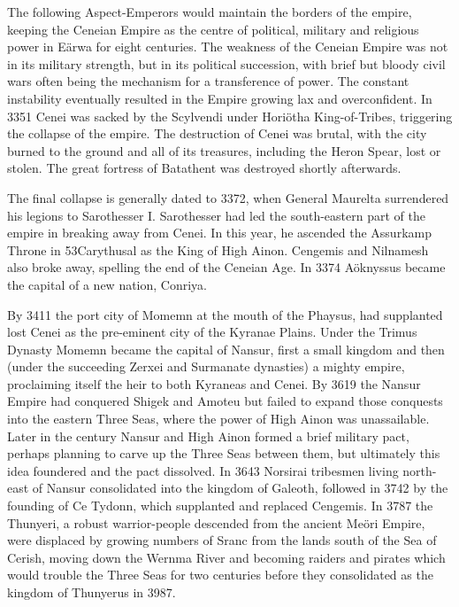\documentclass[]{book}
\begin{document}
The following Aspect-Emperors would maintain the borders of the empire, keeping the
Ceneian Empire as the centre of political, military and religious power in Eärwa for
eight centuries. The weakness of the Ceneian Empire was not in its military strength,
but in its political succession, with brief but bloody civil wars often being the
mechanism for a transference of power. The constant instability eventually resulted in
the Empire growing lax and overconfident. In 3351 Cenei was sacked by the Scylvendi
under Horiötha King-of-Tribes, triggering the collapse of the empire. The destruction of
Cenei was brutal, with the city burned to the ground and all of its treasures, including
the Heron Spear, lost or stolen. The great fortress of Batathent was destroyed shortly
afterwards.

The final collapse is generally dated to 3372, when General Maurelta surrendered his
legions to Sarothesser I. Sarothesser had led the south-eastern part of the empire in
breaking away from Cenei. In this year, he ascended the Assurkamp Throne in
53Carythusal as the King of High Ainon. Cengemis and Nilnamesh also broke away,
spelling the end of the Ceneian Age. In 3374 Aöknyssus became the capital of a new
nation, Conriya.

By 3411 the port city of Momemn at the mouth of the Phaysus, had supplanted lost
Cenei as the pre-eminent city of the Kyranae Plains. Under the Trimus Dynasty
Momemn became the capital of Nansur, first a small kingdom and then (under the
succeeding Zerxei and Surmanate dynasties) a mighty empire, proclaiming itself the heir
to both Kyraneas and Cenei. By 3619 the Nansur Empire had conquered Shigek and
Amoteu but failed to expand those conquests into the eastern Three Seas, where the
power of High Ainon was unassailable. Later in the century Nansur and High Ainon
formed a brief military pact, perhaps planning to carve up the Three Seas between
them, but ultimately this idea foundered and the pact dissolved. In 3643 Norsirai
tribesmen living north-east of Nansur consolidated into the kingdom of Galeoth,
followed in 3742 by the founding of Ce Tydonn, which supplanted and replaced
Cengemis. In 3787 the Thunyeri, a robust warrior-people descended from the ancient
Meöri Empire, were displaced by growing numbers of Sranc from the lands south of the
Sea of Cerish, moving down the Wernma River and becoming raiders and pirates
which would trouble the Three Seas for two centuries before they consolidated as the
kingdom of Thunyerus in 3987.
\end{document}

